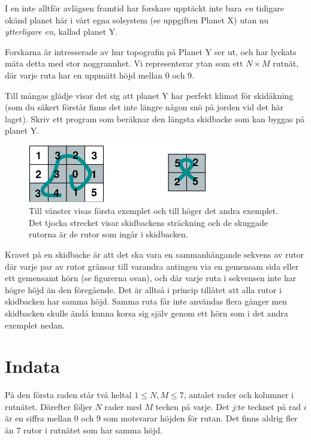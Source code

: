 
I en inte alltför avlägsen framtid har forskare upptäckt inte bara {\em en} tidigare okänd planet här i vårt egna solsystem (se uppgiften Planet X) utan nu {\em ytterligare en}, kallad planet Y.

Forskarna är intresserade av hur topografin på Planet Y ser ut, och har lyckats mäta detta med stor noggrannhet. Vi representerar ytan som ett $N \times M$ rutnät, där varje ruta har en uppmätt höjd mellan 0 och 9.

Till mångas glädje visar det sig att planet Y har perfekt klimat för skidåkning (som du säkert förstår finns det inte längre någon snö på jorden vid det här laget). Skriv ett program som beräknar den längsta skidbacke som kan byggas på planet Y.

\begin{figure}[h]
  \centering
      \includegraphics[width=0.7\textwidth]{planetbackefig2}
      \caption{Till vänster visas första exemplet och till höger det andra exemplet. Det tjocka strecket visar skidbackens sträckning och de skuggade rutorna är de rutor som ingår i skidbacken.}
\end{figure}

Kravet på en skidbacke är att det ska vara en sammanhängande sekvens av rutor där varje par av rutor gränsar till varandra antingen via en gemensam sida eller ett gemensamt hörn (se figurerna ovan), och där varje ruta i sekvensen inte har högre höjd än den föregående. Det är alltså i princip tillåtet att alla rutor i skidbacken har samma höjd. Samma ruta får inte användas flera gånger men skidbacken skulle ändå kunna korsa sig själv genom ett hörn som i det andra exemplet nedan.

\section*{Indata}
På den första raden står två heltal $1 \le N,M \le 7$, 
antalet rader och kolumner i rutnätet.
Därefter följer $N$ rader med $M$ tecken på varje.
Det $j$:te tecknet på rad $i$ är en siffra mellan
0 och 9 som motsvarar höjden för rutan. Det finns aldrig fler än $7$ rutor i rutnätet som har samma höjd.

